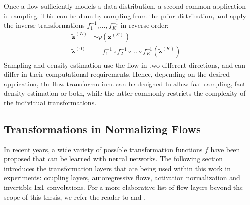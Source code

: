 Once a flow sufficiently models a data distribution, a second common application is sampling. 
This can be done by sampling from the prior distribution, and apply the inverse transformations $f_1^{-1},...,f_K^{-1}$ in reverse order:
\begin{equation}
    \begin{split}
        \bm{\tilde{z}}^{(K)} & \sim p(\bm{z}^{(K)})\\
        \bm{\tilde{z}}^{(0)} & = f_1^{-1} \circ f_2^{-1} \circ ... \circ f_K^{-1}\left( \bm{\tilde{z}}^{(K)}\right)
    \end{split}
\end{equation}
Sampling and density estimation use the flow in two different directions, and can differ in their computational requirements. 
Hence, depending on the desired application, the flow transformations can be designed to allow fast sampling, fast density estimation or both, while the latter commonly restricts the complexity of the individual transformations. 

\subsection{Transformations in Normalizing Flows}
\label{sec:background_flow_layers}

In recent years, a wide variety of possible transformation functions $f$ have been proposed that can be learned with neural networks.
The following section introduces the transformation layers that are being used within this work in experiments: coupling layers, autoregressive flows, activation normalization and invertible 1x1 convolutions.
For a more elaborative list of flow layers beyond the scope of this thesis, we refer the reader to \citet{NormalizingFlowsOverview} and \citet{NormalizingFlowsOverview2}.

